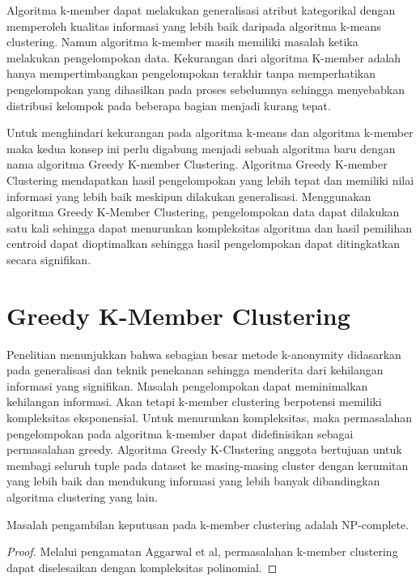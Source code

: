 \par Algoritma k-member dapat melakukan generalisasi atribut kategorikal dengan memperoleh kualitas informasi yang lebih baik daripada algoritma k-means clustering. Namun algoritma k-member masih memiliki masalah ketika melakukan pengelompokan data. Kekurangan dari algoritma K-member adalah hanya mempertimbangkan pengelompokan terakhir tanpa memperhatikan pengelompokan yang dihasilkan pada proses sebelumnya sehingga menyebabkan distribusi kelompok pada beberapa bagian menjadi kurang tepat. 

\par Untuk menghindari kekurangan pada algoritma k-means dan algoritma k-member maka kedua konsep ini perlu digabung menjadi sebuah algoritma baru dengan nama algoritma Greedy K-member Clustering. Algoritma Greedy K-member Clustering mendapatkan hasil pengelompokan yang lebih tepat dan memiliki nilai informasi yang lebih baik meskipun dilakukan generalisasi. Menggunakan algoritma Greedy K-Member Clustering, pengelompokan data dapat dilakukan satu kali sehingga dapat menurunkan kompleksitas algoritma dan hasil  pemilihan centroid dapat dioptimalkan sehingga hasil pengelompokan dapat ditingkatkan secara signifikan. 

\newpage
\section{Greedy K-Member Clustering}
Penelitian menunjukkan bahwa sebagian besar metode k-anonymity didasarkan pada generalisasi dan teknik penekanan sehingga menderita dari kehilangan informasi yang signifikan. Masalah pengelompokan dapat meminimalkan kehilangan informasi. Akan tetapi k-member clustering berpotensi memiliki kompleksitas eksponensial. Untuk menurunkan kompleksitas, maka permasalahan pengelompokan pada algoritma k-member dapat didefinisikan sebagai permasalahan greedy. Algoritma Greedy K-Clustering anggota bertujuan untuk membagi seluruh tuple pada dataset ke masing-masing cluster dengan kerumitan yang lebih baik dan mendukung informasi yang lebih banyak dibandingkan algoritma clustering yang lain.

\begin{theorem}
Masalah pengambilan keputusan pada k-member clustering adalah NP-complete.
\end{theorem}

\begin{proof}
Melalui pengamatan Aggarwal et al, permasalahan k-member clustering dapat diselesaikan dengan kompleksitas polinomial.
\end{proof}

